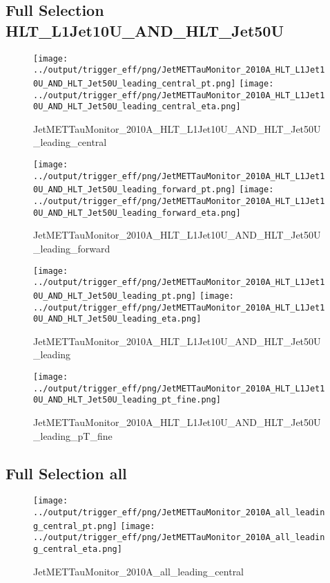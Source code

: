 \documentclass[11pt]{article}
\begin{document}
\newpage
\subsection{Full Selection HLT\_L1Jet10U\_AND\_HLT\_Jet50U}
\begin{figure}[ht]
\centering
\texttt{[image: ../output/trigger\_eff/png/JetMETTauMonitor\_2010A\_HLT\_L1Jet10U\_AND\_HLT\_Jet50U\_leading\_central\_pt.png]}
\texttt{[image: ../output/trigger\_eff/png/JetMETTauMonitor\_2010A\_HLT\_L1Jet10U\_AND\_HLT\_Jet50U\_leading\_central\_eta.png]}
\caption{JetMETTauMonitor\_2010A\_HLT\_L1Jet10U\_AND\_HLT\_Jet50U\_leading\_central}
\label{fig:jetmettaumon_HLT_L1Jet10U_AND_HLT_Jet50U_leading_central}
\end{figure}

\begin{figure}[ht]
\centering
\texttt{[image: ../output/trigger\_eff/png/JetMETTauMonitor\_2010A\_HLT\_L1Jet10U\_AND\_HLT\_Jet50U\_leading\_forward\_pt.png]}
\texttt{[image: ../output/trigger\_eff/png/JetMETTauMonitor\_2010A\_HLT\_L1Jet10U\_AND\_HLT\_Jet50U\_leading\_forward\_eta.png]}
\caption{JetMETTauMonitor\_2010A\_HLT\_L1Jet10U\_AND\_HLT\_Jet50U\_leading\_forward}
\label{fig:jetmettaumon_HLT_L1Jet10U_AND_HLT_Jet50U_leading_forward}
\end{figure}

\begin{figure}[ht]
\centering
\texttt{[image: ../output/trigger\_eff/png/JetMETTauMonitor\_2010A\_HLT\_L1Jet10U\_AND\_HLT\_Jet50U\_leading\_pt.png]}
\texttt{[image: ../output/trigger\_eff/png/JetMETTauMonitor\_2010A\_HLT\_L1Jet10U\_AND\_HLT\_Jet50U\_leading\_eta.png]}
\caption{JetMETTauMonitor\_2010A\_HLT\_L1Jet10U\_AND\_HLT\_Jet50U\_leading}
\label{fig:jetmettaumon_HLT_L1Jet10U_AND_HLT_Jet50U_leading}
\end{figure}

\begin{figure}[ht]
\centering
\texttt{[image: ../output/trigger\_eff/png/JetMETTauMonitor\_2010A\_HLT\_L1Jet10U\_AND\_HLT\_Jet50U\_leading\_pt\_fine.png]}
\caption{JetMETTauMonitor\_2010A\_HLT\_L1Jet10U\_AND\_HLT\_Jet50U\_leading\_pT\_fine}
\label{fig:jetmettaumon_HLT_L1Jet10U_AND_HLT_Jet50U_leading_pT_fine}
\end{figure}
\clearpage


\newpage
\subsection{Full Selection all}
\begin{figure}[ht]
\centering
\texttt{[image: ../output/trigger\_eff/png/JetMETTauMonitor\_2010A\_all\_leading\_central\_pt.png]}
\texttt{[image: ../output/trigger\_eff/png/JetMETTauMonitor\_2010A\_all\_leading\_central\_eta.png]}
\caption{JetMETTauMonitor\_2010A\_all\_leading\_central}
\label{fig:jetmettaumon_all_leading_central}
\end{figure}
\end{document}
